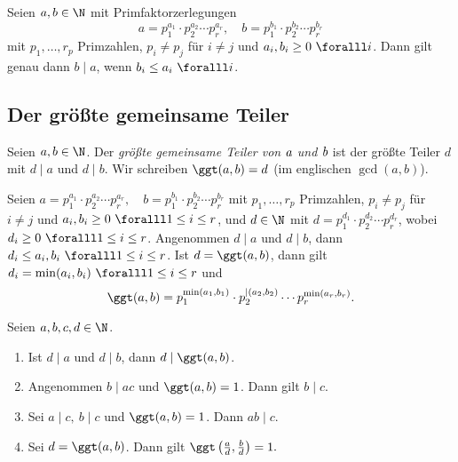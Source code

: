 \begin{thm}\autolabel
	Seien $a, b \in \N$ mit Primfaktorzerlegungen
	\[ a = p_1^{a_1} \cdot p_2^{a_2} \dotsm p_r^{a_r},\quad b = p_1^{b_1} \cdot p_2^{b_2} \dotsm p_r^{b_r} \]
	mit $p_1, \dotsc,r_p$ Primzahlen, $p_i \neq p_j$ für $i \neq j$ und $a_i,b_i \geq 0\ \foralll i$. Dann gilt genau dann \( b \mid a \), wenn \( b_i \leq a_i \ \foralll i \).
\end{thm}

\subsection*{Der größte gemeinsame Teiler}\video

\begin{defn*}
	Seien $a,b \in \N$. Der \emph{größte gemeinsame Teiler von $\emph{a}$ und $\emph{b}$} ist der größte Teiler $d$ mit $d \mid a$ und $d \mid b$. Wir schreiben $\ggt(a,b) = d$ (im englischen $\gcd(a,b)$).
\end{defn*}

\begin{rem*}
Seien $a = p_1^{a_1} \cdot p_2^{a_2} \dotsm p_r^{a_r},\quad b = p_1^{b_1} \cdot p_2^{b_2} \dotsm p_r^{b_r}$ mit $p_1, \dotsc,r_p$ Primzahlen, $p_i \neq p_j$ für $i \neq j$ und $a_i,b_i \geq 0\ \foralll 1 \leq i \leq r$, und $d \in \N$ mit $ d = p_1^{d_1} \cdot p_2^{d_2} \dotsm p_r^{d_r}$, wobei $d_i \geq 0 \ \foralll 1 \leq i \leq r$. Angenommen $d \mid a$ und $d \mid b$, dann $d_i \leq a_i,b_i \ \foralll 1 \leq i \leq r$. Ist $d = \ggt(a,b)$, dann gilt $d_i = \min(a_i,b_i) \ \foralll 1 \leq i \leq r$ und 
$$\ggt(a,b) = p_1^{\min(a_1,b_1)} \cdot p_2^{\mid(a_2,b_2)} \dotsm p_r^{\min(a_r,b_r)}.$$
\end{rem*}

\begin{lem}\autolabel
	Seien $a,b,c,d \in \N$.
	\begin{enumerate}[label={\roman*})]
		\item Ist $d \mid a$ und $d \mid b$, dann $d \mid \ggt(a,b)$.
		\item Angenommen $b \mid ac$ und $\ggt(a,b) = 1$. Dann gilt $b \mid c$.
		\item Sei $a \mid c,\ b \mid c$ und $\ggt(a,b) = 1$. Dann $ab \mid c$.
		\item Sei $d = \ggt(a,b)$. Dann gilt \( \ggt \left( \frac{a}{d},\frac{b}{d} \right) = 1. \)
	\end{enumerate}
\end{lem}

